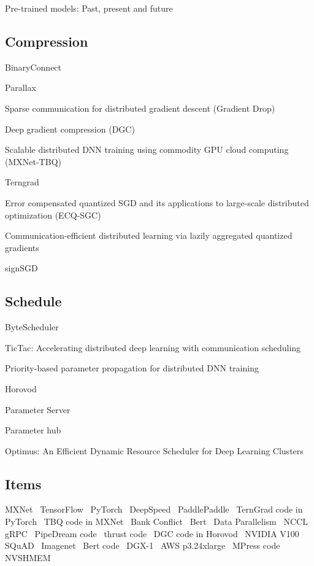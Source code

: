 Pre-trained models: Past, present and future~\cite{han2021pre}

\subsection{Compression}
BinaryConnect~\cite{courbariaux2015binaryconnect}

Parallax~\cite{kim2019parallax}

Sparse communication for distributed gradient descent (Gradient Drop)~\cite{aji2017sparse}

Deep gradient compression (DGC)~\cite{lin2017deep}

Scalable distributed DNN training using commodity GPU cloud computing (MXNet-TBQ)~\cite{strom2015scalable}

Terngrad~\cite{wen2017terngrad}

Error compensated quantized SGD and its applications to large-scale distributed optimization (ECQ-SGC)~\cite{wu2018error}

Communication-efficient distributed learning via lazily aggregated quantized gradients~\cite{sun2019communication}

signSGD~\cite{bernstein2018signsgd}

\subsection{Schedule}

ByteScheduler~\cite{peng2019bytescheduler}

TicTac: Accelerating distributed deep learning with communication scheduling~\cite{hashemi2018tictac}

Priority-based parameter propagation for distributed DNN training~\cite{jayarajan2019priority}

Horovod~\cite{horovod}

Parameter Server~\cite{li2013parameter}

Parameter hub~\cite{luo2018parameter}

Optimus: An Efficient Dynamic Resource Scheduler for Deep Learning Clusters~\cite{Peng2018Optimus}

\subsection{Items}

MXNet~\cite{chen2015mxnet, MXNetWebsite}
TensorFlow~\cite{Tensorflow}
PyTorch~\cite{Pytorch}
DeepSpeed~\cite{DeepSpeedCode,rasley2020deepspeed}
PaddlePaddle~\cite{paddlepaddlecode}
TernGrad code in PyTorch~\cite{open-source-Terngrad}
TBQ code in MXNet~\cite{open-source-TBQ}
Bank Conflict~\cite{bank-conflicts-in-GPU}
Bert~\cite{devlin2018bert}
Data Parallelism~\cite{dean2012large}
NCCL~\cite{NCCL}
gRPC~\cite{grpc}
PipeDream code~\cite{pipedreamcode}
thrust code~\cite{thrust}
DGC code in Horovod~\cite{horovoddgc}
NVIDIA V100~\cite{NVIDIAV100}
SQuAD~\cite{SQuAD}
Imagenet~\cite{Imagenet}
Bert code~\cite{bertgithub}
DGX-1~\cite{dgx-1-whitepaper}
AWS p3.24xlarge~\cite{awsp324xlarge}
MPress code~\cite{mpressopensource}
NVSHMEM~\cite{NVSHMEM}
